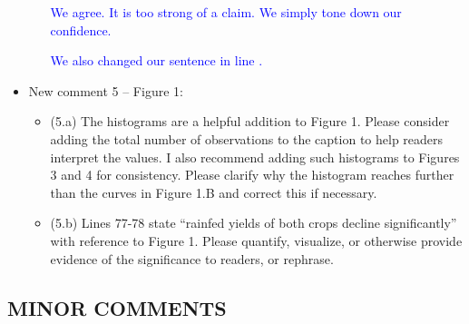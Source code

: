 \documentclass[
]{article}
\begin{document}
\begin{itemize}
\begin{itemize}
  \textcolor{blue}{We agree. It is too strong of a claim. We simply tone down our confidence.}

  \textcolor{blue}{We also changed our sentence in line .}
  
  \end{itemize}

\item New comment 5 – Figure 1:

  \begin{itemize}
   \item (5.a) The histograms are a helpful addition to Figure 1. Please consider adding the total number of observations to the caption to help readers interpret the values. I also recommend adding such histograms to Figures 3 and 4 for consistency. Please clarify why the histogram reaches further than the curves in Figure 1.B and correct this if necessary.

  \item (5.b) Lines 77-78 state ``rainfed yields of both crops decline significantly'' with reference to Figure 1. Please quantify, visualize, or otherwise provide evidence of the significance to readers, or rephrase.
  \end{itemize}

\end{itemize}

\subsection{MINOR COMMENTS}
\end{document}
